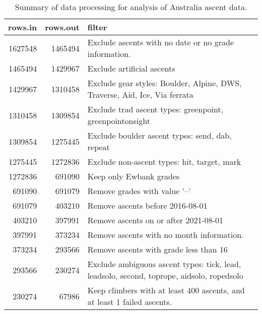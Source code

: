 \begin{table}[ht]
\centering
\begingroup\fontsize{9pt}{10pt}\selectfont
\begin{tabular}{rrl}
  \hline
{\bf rows.in} & {\bf rows.out} & {\bf filter} \\ 
  \hline
1627548 & 1465494 & Exclude ascents with no date or no grade information. \\ 
  1465494 & 1429967 & Exclude artificial ascents \\ 
  1429967 & 1310458 & Exclude gear styles: Boulder, Alpine, DWS, Traverse, Aid, Ice, Via ferrata \\ 
  1310458 & 1309854 & Exclude trad ascent types: greenpoint, greenpointonsight \\ 
  1309854 & 1275445 & Exclude boulder ascent types: send, dab, repeat \\ 
  1275445 & 1272836 & Exclude non-ascent types: hit, target, mark \\ 
  1272836 & 691090 & Keep only Ewbank grades \\ 
  691090 & 691079 & Remove grades with value '--' \\ 
  691079 & 403210 & Remove ascents before 2016-08-01 \\ 
  403210 & 397991 & Remove ascents on or after 2021-08-01 \\ 
  397991 & 373234 & Remove ascents with no month information. \\ 
  373234 & 293566 & Remove ascents with grade less than 16 \\ 
  293566 & 230274 & Exclude ambiguous ascent types: tick, lead, leadsolo, second, toprope, aidsolo, ropedsolo \\ 
  230274 & 67986 & Keep climbers with at least 400 ascents, and at least 1 failed ascents. \\ 
   \hline
\end{tabular}
\endgroup
\caption{Summary of data processing for analysis of Australia ascent data.} 
\label{table-data-processing-aus}
\end{table}
